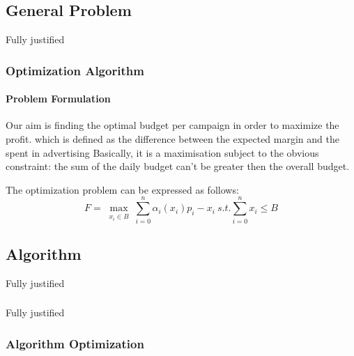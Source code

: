 \documentclass{beamer}
\begin{document}
\subsection{General Problem}

\begin{frame}{Fully justified}

\frametitle{Optimization Algorithm}
\framesubtitle{Problem Formulation}
Our aim is finding the optimal budget per campaign in order to maximize the profit.
which is defined as the difference between the expected margin and the spent in advertising
Basically, it is a maximisation subject to the obvious constraint: the sum of the daily budget can't be greater then the overall budget.

The optimization problem can be expressed as follows:
\begin{displaymath}
F=\max_{\substack{x_i\in B}} \sum_{i=0}^n \alpha_i(x_i)p_i-x_i \ s.t. \sum_{i=0}^n x_i\leq B
\end{displaymath}

\end{frame}


\subsection{Algorithm}


\begin {frame} {Fully justified}

\frametitle{}
\framesubtitle{}

\end {frame}


\begin {frame} {Fully justified}

\frametitle{Algorithm Optimization}
\framesubtitle{}

\end {frame}




\AtBeginSection[]
{
\begin{frame}{}
    \tableofcontents[currentsection]
\end{frame}
}
\end{document}
